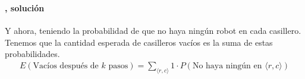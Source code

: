 \documentclass[../main.tex]{subfiles}
\begin{document}
\begin{frame}
  \frametitle{\SECTIOND}
  \framesubtitle{\EJD, solución}

  Y ahora, teniendo la probabilidad de que no haya ningún robot en cada casillero. Tenemos que la cantidad esperada de casilleros vacíos es la suma de estas probabilidades. \pause 
  \begin{gather*}
    E(\text{Vacíos después de \(k\) pasos}) = \sum_{\langle r, c \rangle}1 \cdot P(\text{No haya ningún en } \langle r, c \rangle)
  \end{gather*}
\end{frame}
\end{document}
